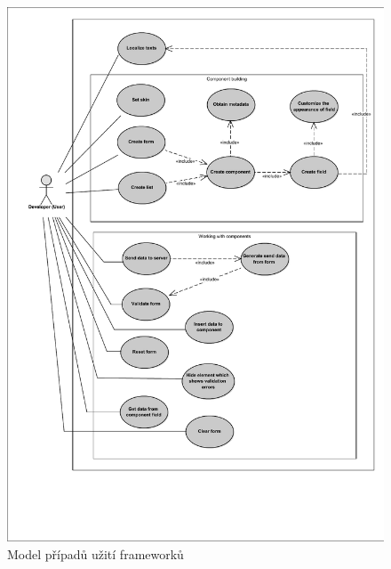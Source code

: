 \begin{figure}
\begin{center}
\includegraphics[width=\textwidth, height=\textheight, keepaspectratio, trim=4 4 4 4, clip]{figures/useCaseModel}
\caption{Model případů užití frameworků}
\label{img:useCaseModel}
\end{center}
\end{figure}


